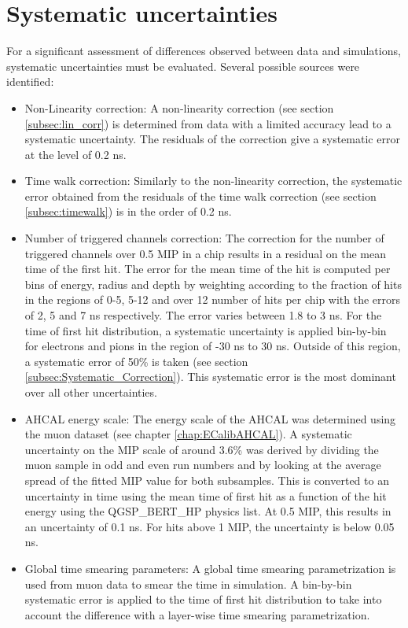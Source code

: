 \section{Systematic uncertainties}

For a significant assessment of differences observed between data and simulations, systematic uncertainties must be evaluated. Several possible sources were identified:

\begin{itemize}
	\item Non-Linearity correction: A non-linearity correction (see section \ref{subsec:lin_corr}) is determined from data with a limited accuracy lead to a systematic uncertainty. The residuals of the correction give a systematic error at the level of 0.2 ns.
	\item Time walk correction: Similarly to the non-linearity correction, the systematic error obtained from the residuals of the time walk correction (see section \ref{subsec:timewalk}) is in the order of 0.2 ns.
	\item Number of triggered channels correction: The correction for the number of triggered channels over 0.5 MIP in a chip results in a residual on the mean time of the first hit. The error for the mean time of the hit is computed per bins of energy, radius and depth by weighting according to the fraction of hits in the regions of 0-5, 5-12 and over 12 number of hits per chip with the errors of 2, 5 and 7 ns respectively. The error varies between 1.8 to 3 ns. For the time of first hit distribution, a systematic uncertainty is applied bin-by-bin for electrons and pions in the region of -30 ns to 30 ns. Outside of this region, a systematic error of 50\% is taken (see section \ref{subsec:Systematic_Correction}). This systematic error is the most dominant over all other uncertainties.
	\item AHCAL energy scale: The energy scale of the AHCAL was determined using the muon dataset (see chapter \ref{chap:ECalibAHCAL}). A systematic uncertainty on the MIP scale of around 3.6\% was derived by dividing the muon sample in odd and even run numbers and by looking at the average spread of the fitted MIP value for both subsamples. This is converted to an uncertainty in time using the mean time of first hit as a function of the hit energy using the QGSP\_BERT\_HP physics list. At 0.5 MIP, this results in an uncertainty of 0.1 ns. For hits above 1 MIP, the uncertainty is below 0.05 ns.
	\item Global time smearing parameters: A global time smearing parametrization is used from muon data to smear the time in simulation. A bin-by-bin systematic error is applied to the time of first hit distribution to take into account the difference with a layer-wise time smearing parametrization.

\end{itemize}
